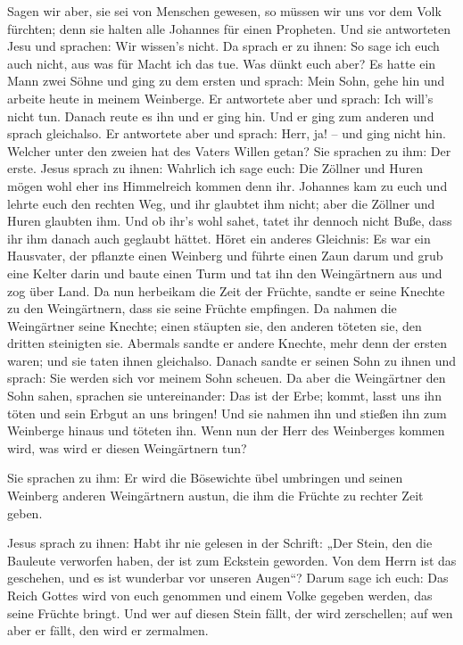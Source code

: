  Sagen wir aber, sie sei von Menschen gewesen, so müssen
wir uns vor dem Volk fürchten; denn sie halten alle Johannes für einen
Propheten.  Und sie antworteten Jesu und sprachen: Wir
wissen's nicht. Da sprach er zu ihnen: So sage ich euch auch nicht, aus
was für Macht ich das tue.  Was dünkt euch aber? Es hatte
ein Mann zwei Söhne und ging zu dem ersten und sprach: Mein Sohn, gehe
hin und arbeite heute in meinem Weinberge.  Er antwortete
aber und sprach: Ich will's nicht tun. Danach reute es ihn und er ging
hin.  Und er ging zum anderen und sprach gleichalso. Er
antwortete aber und sprach: Herr, ja! -- und ging nicht hin.
 Welcher unter den zweien hat des Vaters Willen getan?
Sie sprachen zu ihm: Der erste. Jesus sprach zu ihnen: Wahrlich ich sage
euch: Die Zöllner und Huren mögen wohl eher ins Himmelreich kommen denn
ihr.  Johannes kam zu euch und lehrte euch den rechten
Weg, und ihr glaubtet ihm nicht; aber die Zöllner und Huren glaubten
ihm. Und ob ihr's wohl sahet, tatet ihr dennoch nicht Buße, dass ihr ihm
danach auch geglaubt hättet.  Höret ein anderes
Gleichnis: Es war ein Hausvater, der pflanzte einen Weinberg und führte
einen Zaun darum und grub eine Kelter darin und baute einen Turm und tat
ihn den Weingärtnern aus und zog über Land.  Da nun
herbeikam die Zeit der Früchte, sandte er seine Knechte zu den
Weingärtnern, dass sie seine Früchte empfingen.  Da
nahmen die Weingärtner seine Knechte; einen stäupten sie, den anderen
töteten sie, den dritten steinigten sie.  Abermals sandte
er andere Knechte, mehr denn der ersten waren; und sie taten ihnen
gleichalso.  Danach sandte er seinen Sohn zu ihnen und
sprach: Sie werden sich vor meinem Sohn scheuen.  Da aber
die Weingärtner den Sohn sahen, sprachen sie untereinander: Das ist der
Erbe; kommt, lasst uns ihn töten und sein Erbgut an uns bringen!
 Und sie nahmen ihn und stießen ihn zum Weinberge hinaus
und töteten ihn.  Wenn nun der Herr des Weinberges kommen
wird, was wird er diesen Weingärtnern tun?

 Sie sprachen zu ihm: Er wird die Bösewichte übel
umbringen und seinen Weinberg anderen Weingärtnern austun, die ihm die
Früchte zu rechter Zeit geben.

 Jesus sprach zu ihnen: Habt ihr nie gelesen in der
Schrift: „Der Stein, den die Bauleute verworfen haben, der ist zum
Eckstein geworden. Von dem Herrn ist das geschehen, und es ist wunderbar
vor unseren Augen``?  Darum sage ich euch: Das Reich
Gottes wird von euch genommen und einem Volke gegeben werden, das seine
Früchte bringt.  Und wer auf diesen Stein fällt, der wird
zerschellen; auf wen aber er fällt, den wird er zermalmen.


